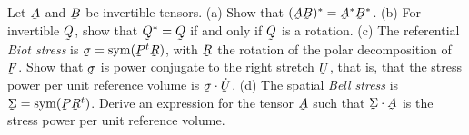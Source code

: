 \begin{problem}
Let $\bA$ and $\bB$ be invertible tensors.
\textup{(a)} Show that $(\bA\bB)^{*}=\bA^{*}\bB^{*}$.
\textup{(b)} For invertible $\bQ$, show that $\bQ^{*}=\bQ$ if and only
if $\bQ$ is a rotation.
\textup{(c)} The referential \emph{Biot stress} is
$\vek\sigma=\Sym(\bP^{t}\bR)$, with $\bR$ the rotation of the polar
decomposition of $\bF$. Show that $\vek\sigma$ is power conjugate to the
right stretch $\bU$, that is, that the stress power per unit reference
volume is $\vek\sigma\cdot\dot\bU$.
\textup{(d)} The spatial \emph{Bell stress} is
$\vek\Sigma=\Sym(\bP\bR^{t})$. Derive an expression for the tensor
$\bA$ such that $\vek\Sigma\cdot\bA$ is the stress power per unit
reference volume.
\end{problem}

